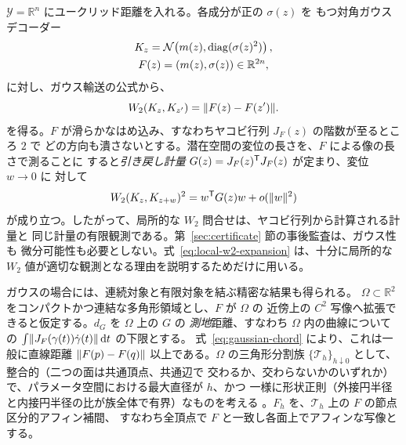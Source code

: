 $\mathcal Y=\mathbb R^n$ にユークリッド距離を入れる。各成分が正の $\sigma(z)$ を
もつ対角ガウスデコーダー
\begin{equation}
 \begin{gathered}
 K_z=\mathcal N\!\left(m(z),\operatorname{diag}(\sigma(z)^2)\right),\\
 F(z)=(m(z),\sigma(z))\in\mathbb R^{2n},
 \end{gathered}
 \label{eq:diagonal-gaussian-decoder}
\end{equation}
に対し、ガウス輸送の公式から\cite{givensshortt1984,takatsu2011}、
\begin{equation}
 W_2(K_z,K_{z'})=\lVert F(z)-F(z')\rVert.
 \label{eq:gaussian-chord}
\end{equation}
を得る。$F$ が滑らかなはめ込み、すなわちヤコビ行列 $J_F(z)$ の階数が至るところ $2$ で
どの方向も潰さないとする。潜在空間の変位の長さを、$F$ による像の長さで測ることに
すると\emph{引き戻し計量} $G(z)=J_F(z)^{\mathsf{T}}J_F(z)$ が定まり、変位 $w\to0$ に
対して
\begin{equation}
 W_2(K_z,K_{z+w})^2
 =w^{\mathsf{T}}G(z)w+o(\lVert w\rVert^2)
 \label{eq:local-w2-expansion}
\end{equation}
が成り立つ。したがって、局所的な $W_2$ 問合せは、ヤコビ行列から計算される計量と
同じ計量の有限観測である。第~\ref{sec:certificate} 節の事後監査は、ガウス性も
微分可能性も必要としない。式~\eqref{eq:local-w2-expansion} は、十分に局所的な
$W_2$ 値が適切な観測となる理由を説明するためだけに用いる。

ガウスの場合には、連続対象と有限対象を結ぶ精密な結果も得られる。
$\Omega\subset\mathbb R^2$ をコンパクトかつ連結な多角形領域とし、$F$ が $\Omega$ の
近傍上の $C^2$ 写像へ拡張できると仮定する。$d_G$ を $\Omega$ 上の $G$ の
\emph{測地}距離、すなわち $\Omega$ 内の曲線についての
$\int\lVert J_F(\gamma(t))\dot\gamma(t)\rVert\,\mathrm{d} t$ の下限とする。
式~\eqref{eq:gaussian-chord} により、これは一般に直線距離
$\lVert F(p)-F(q)\rVert$ 以上である。$\Omega$ の三角形分割族
$\{\mathcal T_h\}_{h\downarrow0}$ として、整合的（二つの面は共通頂点、共通辺で
交わるか、交わらないかのいずれか）で、パラメータ空間における最大直径が $h$、かつ
一様に形状正則（外接円半径と内接円半径の比が族全体で有界）なものを考える
\cite{ciarlet1978}。$F_h$ を、$\mathcal T_h$ 上の $F$ の節点区分的アフィン補間、
すなわち全頂点で $F$ と一致し各面上でアフィンな写像とする。

